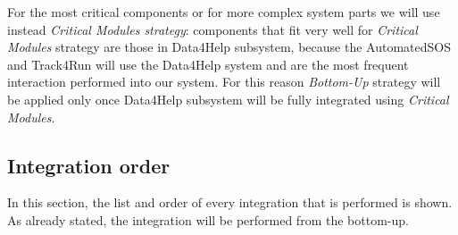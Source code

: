 \documentclass[a4paper, hidelinks, 12pt]{report}
\begin{document}
For the most critical components or for more complex system parts we will use instead \textit{Critical Modules strategy}: components that fit very well for \textit{Critical Modules} strategy are those in Data4Help subsystem, because the AutomatedSOS and Track4Run will use the Data4Help system and are the most frequent interaction performed into our system. For this reason \textit{Bottom-Up} strategy will be applied only once Data4Help subsystem will be fully integrated using \textit{Critical Modules}.

\subsection{Integration order}
In this section, the list and order of every integration that is performed is shown. As already stated, the integration will be performed from the bottom-up. \\
\end{document}
